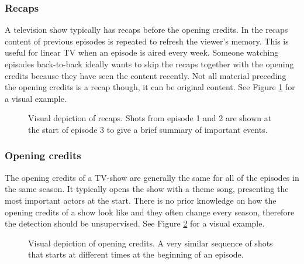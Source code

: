 \documentclass{report}
\begin{document}
\subsubsection{Recaps}
A television show typically has recaps before the opening credits. In the recaps content of previous episodes is repeated to refresh the viewer's memory. This is useful for linear TV when an episode is aired every week. Someone watching episodes back-to-back ideally wants to skip the recaps together with the opening credits because they have seen the content recently. Not all material preceding the opening credits is a recap though, it can be original content. See Figure \ref{fig:contextrecaps} for a visual example.

\begin{figure}[H]
	\caption{Visual depiction of recaps. Shots from episode 1 and 2 are shown at the start of episode 3 to give a brief summary of important events.}
	\label{fig:contextrecaps}
\end{figure}

\subsubsection{Opening credits}
The opening credits of a TV-show are generally the same for all of the episodes in the same season. It typically opens the show with a theme song, presenting the most important actors at the start. There is no prior knowledge on how the opening credits of a show look like and they often change every season, therefore the detection should be unsupervised. See Figure \ref{fig:contextopeningcredits} for a visual example.

\begin{figure}[H]
	\caption{Visual depiction of opening credits. A very similar sequence of shots that starts at different times at the beginning of an episode.}
	\label{fig:contextopeningcredits}
\end{figure}
\end{document}
